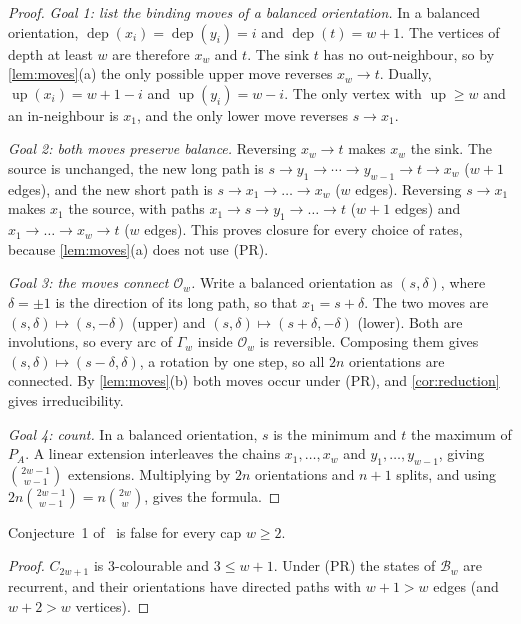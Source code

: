 \documentclass[11pt,a4paper]{article}
\theoremstyle{plain}
\theoremstyle{plain}
\newcommand{\dep}{\operatorname{dep}}
\newcommand{\up}{\operatorname{up}}
\newcommand{\Bal}{\mathcal{B}}
\newcommand{\Obal}{\mathcal{O}}
\newcommand{\G}{\Gamma}
\begin{document}
\begin{proof}
\emph{Goal 1: list the binding moves of a balanced orientation.} In a balanced orientation, $\dep(x_i)=\dep(y_i)=i$ and $\dep(t)=w+1$. The vertices of depth at least $w$ are therefore $x_w$ and $t$. The sink $t$ has no out-neighbour, so by \cref{lem:moves}(a) the only possible upper move reverses $x_w\to t$. Dually, $\up(x_i)=w+1-i$ and $\up(y_i)=w-i$. The only vertex with $\up\ge w$ and an in-neighbour is $x_1$, and the only lower move reverses $s\to x_1$.

\emph{Goal 2: both moves preserve balance.} Reversing $x_w\to t$ makes $x_w$ the sink. The source is unchanged, the new long path is $s\to y_1\to\cdots\to y_{w-1}\to t\to x_w$ ($w+1$ edges), and the new short path is $s\to x_1\to\dots\to x_w$ ($w$ edges). Reversing $s\to x_1$ makes $x_1$ the source, with paths $x_1\to s\to y_1\to\dots\to t$ ($w+1$ edges) and $x_1\to\dots\to x_w\to t$ ($w$ edges). This proves closure for every choice of rates, because \cref{lem:moves}(a) does not use (PR).

\emph{Goal 3: the moves connect $\Obal_w$.} Write a balanced orientation as $(s,\delta)$, where $\delta=\pm1$ is the direction of its long path, so that $x_1=s+\delta$. The two moves are $(s,\delta)\mapsto(s,-\delta)$ (upper) and $(s,\delta)\mapsto(s+\delta,-\delta)$ (lower). Both are involutions, so every arc of $\G_w$ inside $\Obal_w$ is reversible. Composing them gives $(s,\delta)\mapsto(s-\delta,\delta)$, a rotation by one step, so all $2n$ orientations are connected. By \cref{lem:moves}(b) both moves occur under (PR), and \cref{cor:reduction} gives irreducibility.

\emph{Goal 4: count.} In a balanced orientation, $s$ is the minimum and $t$ the maximum of $P_A$. A linear extension interleaves the chains $x_1,\dots,x_w$ and $y_1,\dots,y_{w-1}$, giving $\binom{2w-1}{w-1}$ extensions. Multiplying by $2n$ orientations and $n+1$ splits, and using $2n\binom{2w-1}{w-1}=n\binom{2w}{w}$, gives the formula.
\end{proof}

\begin{corollary}\label{cor:false}
Conjecture~1 of~\cite{DG2024} is false for every cap $w\ge2$.
\end{corollary}

\begin{proof}
$C_{2w+1}$ is $3$-colourable and $3\le w+1$. Under (PR) the states of $\Bal_w$ are recurrent, and their orientations have directed paths with $w+1>w$ edges (and $w+2>w$ vertices).
\end{proof}
\end{document}
